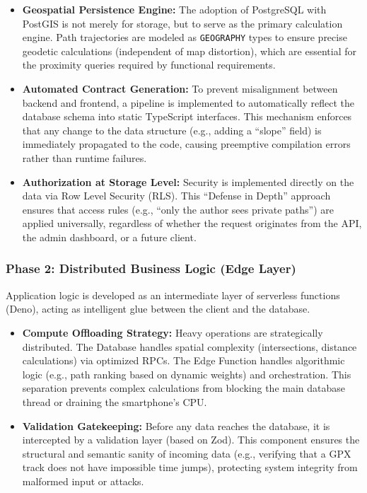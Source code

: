 \begin{itemize}
    \item \textbf{Geospatial Persistence Engine:} The adoption of PostgreSQL with PostGIS is not merely for storage, but to serve as the primary calculation engine. Path trajectories are modeled as \texttt{GEOGRAPHY} types to ensure precise geodetic calculations (independent of map distortion), which are essential for the proximity queries required by functional requirements.
    \item \textbf{Automated Contract Generation:} To prevent misalignment between backend and frontend, a pipeline is implemented to automatically reflect the database schema into static TypeScript interfaces. This mechanism enforces that any change to the data structure (e.g., adding a ``slope'' field) is immediately propagated to the code, causing preemptive compilation errors rather than runtime failures.
    \item \textbf{Authorization at Storage Level:} Security is implemented directly on the data via Row Level Security (RLS). This ``Defense in Depth'' approach ensures that access rules (e.g., ``only the author sees private paths'') are applied universally, regardless of whether the request originates from the API, the admin dashboard, or a future client.
\end{itemize}

\subsubsection{Phase 2: Distributed Business Logic (Edge Layer)}
Application logic is developed as an intermediate layer of serverless functions (Deno), acting as intelligent glue between the client and the database.

\begin{itemize}
    \item \textbf{Compute Offloading Strategy:} Heavy operations are strategically distributed. The Database handles spatial complexity (intersections, distance calculations) via optimized RPCs. The Edge Function handles algorithmic logic (e.g., path ranking based on dynamic weights) and orchestration. This separation prevents complex calculations from blocking the main database thread or draining the smartphone's CPU.
    \item \textbf{Validation Gatekeeping:} Before any data reaches the database, it is intercepted by a validation layer (based on Zod). This component ensures the structural and semantic sanity of incoming data (e.g., verifying that a GPX track does not have impossible time jumps), protecting system integrity from malformed input or attacks.
\end{itemize}

